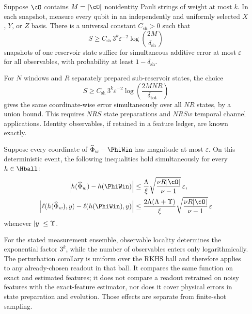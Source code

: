 \begin{proposition}
\label{prop:shadows}
Suppose \(\cO\) contains \(M=|\cO|\) nonidentity Pauli strings of weight at
most \(k\). In each snapshot, measure every qubit in an independently and
uniformly selected \(X\), \(Y\), or \(Z\) basis. There is a universal
constant \(C_{\mathrm{sh}}>0\) such that
\begin{equation}
    S
    \geq
    C_{\mathrm{sh}}\,3^k\varepsilon^{-2}
    \log\!\left(\frac{2M}{\delta_{\mathrm{sh}}}\right)
    \label{eq:shadow-samples}
\end{equation}
snapshots of one reservoir state suffice for simultaneous additive error at
most \(\varepsilon\) for all observables, with probability at least
\(1-\delta_{\mathrm{sh}}\).

For \(N\) windows and \(R\) separately prepared sub-reservoir states, the
choice
\begin{equation}
    S\geq
    C_{\mathrm{sh}}\,3^k\varepsilon^{-2}
    \log\!\left(\frac{2MNR}{\delta_{\mathrm{tot}}}\right)
    \label{eq:shadow-samples-total}
\end{equation}
gives the same coordinate-wise error simultaneously over all \(NR\) states,
by a union bound. This requires \(NRS\) state preparations and \(NRSw\)
temporal channel applications. Identity observables, if retained in a feature
ledger, are known exactly.
\end{proposition}

\begin{corollary}
\label{cor:measurement-stability}
Suppose every coordinate of \(\widehat\Phi_w-\PhiWin\) has magnitude at most
\(\varepsilon\). On this deterministic event, the following inequalities hold
simultaneously for every \(h\in\Hball\):
\begin{align}
    \abs{h(\widehat\Phi_w)-h(\PhiWin)}
    &\leq
    \frac{\Lambda}{\xi}
    \sqrt{\frac{\nu R|\cO|}{\nu-1}}\,\varepsilon,
    \label{eq:shot-prediction}\\
    \abs{
      \ell(h(\widehat\Phi_w),y)
      -\ell(h(\PhiWin),y)
    }
    &\leq
    \frac{2\Lambda(\Lambda+\Upsilon)}{\xi}
    \sqrt{\frac{\nu R|\cO|}{\nu-1}}\,\varepsilon
    \label{eq:shot-loss}
\end{align}
whenever \(\left| y \right|\leq\Upsilon\).
\end{corollary}

For the stated measurement ensemble, observable locality determines the
exponential factor \(3^k\), while the number of observables enters only
logarithmically. The perturbation corollary is uniform over the RKHS ball and therefore applies
to any already-chosen readout in that ball. It compares the same function on
exact and estimated features; it does not compare a readout retrained on noisy
features with the exact-feature estimator, nor does it cover physical errors in
state preparation and evolution. Those effects are separate from finite-shot
sampling.

